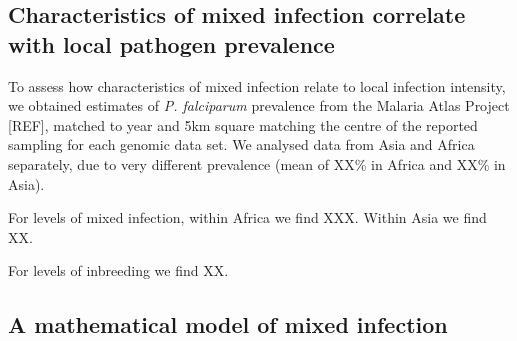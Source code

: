 \documentclass[9pt,lineno]{elife}
\begin{document}
\begin{figure}[ht]
  \begin{center}
   \caption{}\label{fig:strainIBD}
   \end{center}
\end{figure}


\subsection{Characteristics of mixed infection correlate with local pathogen prevalence}

To assess how characteristics of mixed infection relate to local infection intensity, we obtained estimates of {\it P. falciparum} prevalence from the Malaria Atlas Project [REF], matched to year and 5km square matching the centre of the reported sampling for each genomic data set.  We analysed data from Asia and Africa separately, due to very different prevalence (mean of XX\% in Africa and XX\% in Asia).

For levels of mixed infection, within Africa we find XXX.  Within Asia we find XX.

For levels of inbreeding we find XX.




\subsection{A mathematical model of mixed infection}
\end{document}
